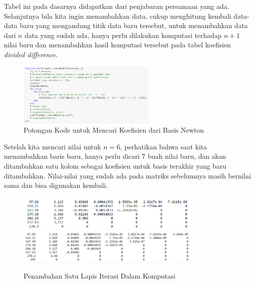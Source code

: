 \documentclass[11pt, a4paper, onecolumn, oneside, final]{report}
\begin{document}

Tabel ini pada dasarnya didapatkan dari penjabaran persamaan yang ada. Selanjutnya bila kita ingin menambahkan data, cukup menghitung kembali data-data baru yang mengandung titik data baru tersebut, untuk menambahkan data dari $n$ data yang sudah ada, hanya perlu dilakukan komputasi terhadap $n + 1$ nilai baru dan menambahkan hasil komputasi tersebut pada tabel koefisien \textit{divided difference}.

\begin{figure}[h!]
    \centering
    \includegraphics[width=0.6\textwidth]{assets/divided.png}
    \caption{Potongan Kode untuk Mencari Koefisien dari Basis Newton}
\end{figure}

Setelah kita mencari nilai untuk $n = 6$, perhatikan bahwa saat kita menambahkan baris baru, hanya perlu dicari $7$ buah nilai baru, dan akan ditambahkan satu kolom sebagai koefisien untuk basis terakhir yang baru ditambahkan. Nilai-nilai yang sudah ada pada matriks sebelumnya masih bernilai sama dan bisa digunakan kembali.

\begin{figure}[h!]
    \centering
    \includegraphics[width=0.8\textwidth]{assets/n6.png}
    \includegraphics[width=0.8\textwidth]{assets/n7.png}
    \caption{Penambahan Satu Lapis Iterasi Dalam Komputasi}
\end{figure}
\end{document}
